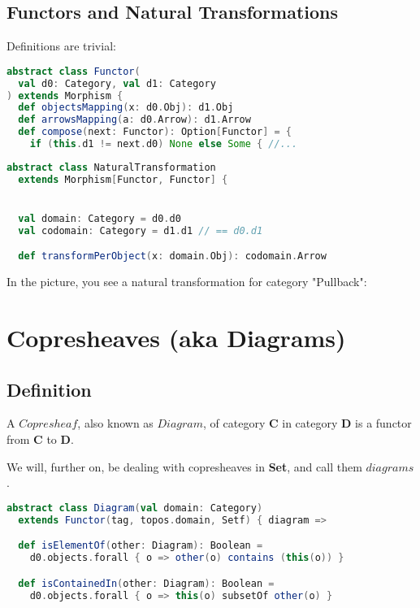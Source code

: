 \documentclass[10pt]{asme2ej}
\newcommand{\catname}[1]{\textbf{#1}}
\newcommand{\Set}{\catname{Set}}
\begin{document}
\subsection{Functors and Natural Transformations}

Definitions are trivial:

\begin{lstlisting}[language=Scala]
abstract class Functor(
  val d0: Category, val d1: Category
) extends Morphism {
  def objectsMapping(x: d0.Obj): d1.Obj
  def arrowsMapping(a: d0.Arrow): d1.Arrow
  def compose(next: Functor): Option[Functor] = {
    if (this.d1 != next.d0) None else Some { //...
\end{lstlisting}


\begin{lstlisting}[language=Scala]
abstract class NaturalTransformation
  extends Morphism[Functor, Functor] {


  val domain: Category = d0.d0
  val codomain: Category = d1.d1 // == d0.d1

  def transformPerObject(x: domain.Obj): codomain.Arrow
\end{lstlisting}

In the picture, you see a natural transformation for category "Pullback":


\section{Copresheaves (aka Diagrams)}

\subsection{Definition}
A $Copresheaf$, also known as $Diagram$, of category \catname{C} in category \catname{D} is a functor from \catname{C} to \catname{D}.

We will, further on, be dealing with copresheaves in \Set, and call them $diagrams$.

\begin{lstlisting}[language=Scala]
abstract class Diagram(val domain: Category)
  extends Functor(tag, topos.domain, Setf) { diagram =>

  def isElementOf(other: Diagram): Boolean =
    d0.objects.forall { o => other(o) contains (this(o)) }

  def isContainedIn(other: Diagram): Boolean =
    d0.objects.forall { o => this(o) subsetOf other(o) }
\end{lstlisting}
\end{document}
